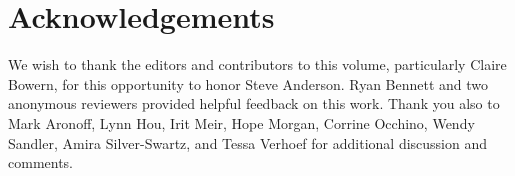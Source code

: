 \documentclass[output=paper,
modfonts
]{LSP/langsci}
\begin{document}
\section*{Acknowledgements}
We wish to thank the editors and contributors to this volume, particularly Claire Bowern, for this opportunity to honor Steve Anderson. Ryan Bennett and two anonymous reviewers provided helpful feedback on this work. Thank you also to Mark Aronoff, Lynn Hou, Irit Meir, Hope Morgan, Corrine Occhino, Wendy Sandler, Amira Silver-Swartz, and Tessa Verhoef for additional discussion and comments.

\printbibliography[heading=subbibliography,notkeyword=this]

\end{document}
